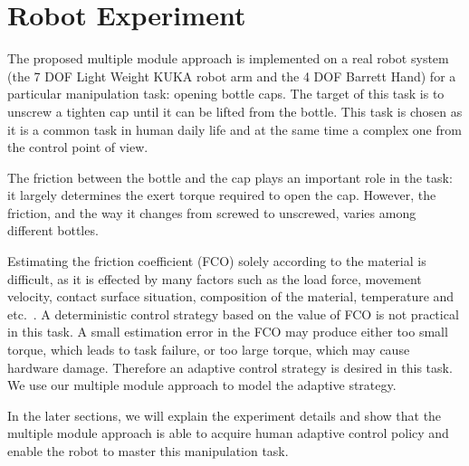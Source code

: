 \section{Robot Experiment}
\label{sec:exp}

The proposed multiple module approach is implemented on a real robot system (the 7 DOF Light Weight KUKA robot arm and the 4 DOF Barrett Hand) for a particular manipulation task: opening bottle caps. The target of this task is to unscrew a tighten cap until it can be lifted from the bottle.
This task is chosen as it is a common task in human daily life and at the same time a complex one from the control point of view.

The friction between the bottle and the cap plays an important role in the task: it largely determines the exert torque required to open the cap. However, the friction, and the way it changes from screwed to unscrewed, varies among different bottles.

Estimating the friction coefficient (FCO) solely according to the material is difficult, as it is effected by many factors such as the load force, movement velocity, contact surface situation, composition of the material, temperature and etc.~\citep{gustafssoninvestigation}. A deterministic control strategy based on the value of FCO is not practical in this task. A small estimation error in the FCO may produce either too small torque, which leads to task failure, or too large torque, which may cause hardware damage. Therefore an adaptive control strategy is desired in this task. %
We use our multiple module approach to model the adaptive strategy.

In the later sections, we will explain the experiment details and show that the multiple module approach is able to acquire human adaptive control policy and enable the robot to master this manipulation task.

